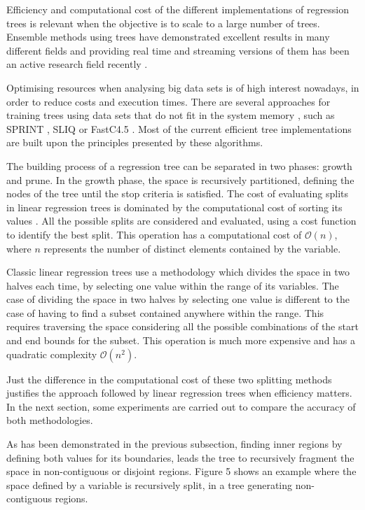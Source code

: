 \documentclass[times,twocolumn,final,authoryear]{elsarticle}
\begin{document}
Efficiency and computational cost of the different implementations of regression trees is relevant when the objective is to scale to a large number of trees. Ensemble methods using trees have demonstrated excellent results in many different fields and providing real time and streaming versions of them has been an active research field recently \citep{Abdulsalametal2007}. 

Optimising resources when analysing big data sets is of high interest nowadays, in order to reduce costs and execution times. There are several approaches for training trees using data sets that do not fit in the system memory \citep{Rokach2016}, such as SPRINT \citep{Shareretal1996}, SLIQ \citep{Mehtaetal1996} or FastC4.5 \citep{Heetal2007}. Most of the current efficient tree implementations are built upon the principles presented by these algorithms.

The building process of a regression tree can be separated in two phases: growth and prune. In the growth phase, the space is recursively partitioned, defining the nodes of the tree until the stop criteria is satisfied. The cost of evaluating splits in linear regression trees is dominated by the computational cost of sorting its values \citep{Shareretal1996}. All the possible splits are considered and evaluated, using a cost function to identify the best split. This operation has a computational cost of $\mathcal{O}(n)$, where $n$ represents the number of distinct elements contained by the variable.

Classic linear regression trees use a methodology which divides the space in two halves each time, by selecting one value within the range of its variables. The case of dividing the space in two halves by selecting one value is different to the case of having to find a subset contained anywhere within the range. This requires traversing the space considering all the possible combinations of the start and end bounds for the subset. This operation is much more expensive and has a quadratic complexity $\mathcal{O}(n^2)$.

Just the difference in the computational cost of these two splitting methods justifies the approach followed by linear regression trees when efficiency matters. In the next section, some experiments are carried out to compare the accuracy of both methodologies.

As has been demonstrated in the previous subsection, finding inner regions by defining both values for its boundaries, leads the tree to recursively fragment the space in non-contiguous or disjoint regions. Figure 5 shows an example where the space defined by a variable is recursively split, in a tree generating non-contiguous regions.
\end{document}
